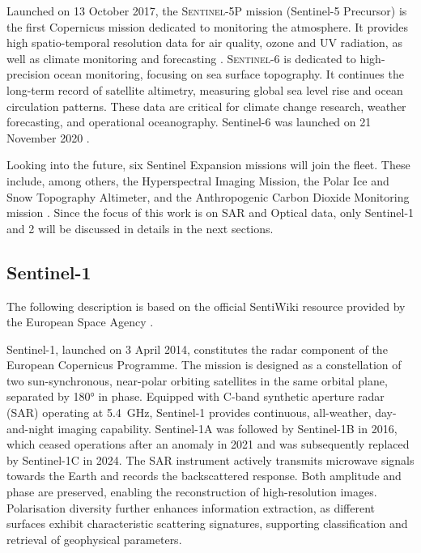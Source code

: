 Launched on 13 October 2017, the \textsc{Sentinel-5P} mission (Sentinel-5 Precursor) is the first Copernicus mission dedicated to monitoring the atmosphere. It provides high spatio-temporal resolution data for air quality, ozone and UV radiation, as well as climate monitoring and forecasting \cite{ESA_SentinelMissions}.
\textsc{Sentinel-6} is dedicated to high-precision ocean monitoring, focusing on sea surface topography. It continues the long-term record of satellite altimetry, measuring global sea level rise and ocean circulation patterns. These data are critical for climate change research, weather forecasting, and operational oceanography. Sentinel-6 was launched on 21 November 2020 \cite{ESA_SentinelMissions}. 

Looking into the future, six Sentinel Expansion missions will join the fleet. These include, among others, the Hyperspectral Imaging Mission, the Polar Ice and Snow Topography Altimeter, and the Anthropogenic Carbon Dioxide Monitoring mission \cite{ESA_Copernicus}.
Since the focus of this work is on SAR and Optical data, only Sentinel-1 and 2 will be discussed in details in the next sections. 

\subsection{Sentinel-1}
The following description is based on the official SentiWiki resource provided by the European Space Agency \cite{sentiwiki}. 

Sentinel-1, launched on 3 April 2014, constitutes the radar component of the European Copernicus Programme. The mission is designed as a constellation of two sun-synchronous, near-polar orbiting satellites in the same orbital plane, separated by 180° in phase. Equipped with C-band synthetic aperture radar (SAR) operating at 5.4~GHz, Sentinel-1 provides continuous, all-weather, day-and-night imaging capability. Sentinel-1A was followed by Sentinel-1B in 2016, which ceased operations after an anomaly in 2021 and was subsequently replaced by Sentinel-1C in 2024.  
The SAR instrument actively transmits microwave signals towards the Earth and records the backscattered response. Both amplitude and phase are preserved, enabling the reconstruction of high-resolution images. Polarisation diversity further enhances information extraction, as different surfaces exhibit characteristic scattering signatures, supporting classification and retrieval of geophysical parameters.  

